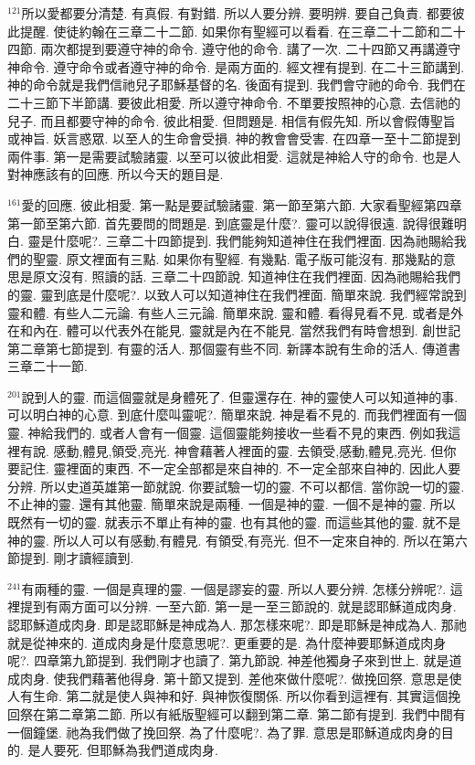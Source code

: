 \documentclass{book}
\begin{document}
$^{121}$所以愛都要分清楚.
有真假.
有對錯.
所以人要分辨.
要明辨.
要自己負責.
都要彼此提醒.
使徒約翰在三章二十二節.
如果你有聖經可以看看.
在三章二十二節和二十四節.
兩次都提到要遵守神的命令.
遵守他的命令.
講了一次.
二十四節又再講遵守神命令.
遵守命令或者遵守神的命令.
是兩方面的.
經文裡有提到.
在二十三節講到.
神的命令就是我們信祂兒子耶穌基督的名.
後面有提到.
我們會守祂的命令.
我們在二十三節下半節講.
要彼此相愛.
所以遵守神命令.
不單要按照神的心意.
去信祂的兒子.
而且都要守神的命令.
彼此相愛.
但問題是.
相信有假先知.
所以會假傳聖旨或神旨.
妖言惑眾.
以至人的生命會受損.
神的教會會受害.
在四章一至十二節提到兩件事.
第一是需要試驗諸靈.
以至可以彼此相愛.
這就是神給人守的命令.
也是人對神應該有的回應.
所以今天的題目是.

$^{161}$愛的回應.
彼此相愛.
第一點是要試驗諸靈.
第一節至第六節.
大家看聖經第四章第一節至第六節.
首先要問的問題是.
到底靈是什麼?.
靈可以說得很遠.
說得很難明白.
靈是什麼呢?.
三章二十四節提到.
我們能夠知道神住在我們裡面.
因為祂賜給我們的聖靈.
原文裡面有三點.
如果你有聖經.
有幾點.
電子版可能沒有.
那幾點的意思是原文沒有.
照讀的話.
三章二十四節說.
知道神住在我們裡面.
因為祂賜給我們的靈.
靈到底是什麼呢?.
以致人可以知道神住在我們裡面.
簡單來說.
我們經常說到靈和體.
有些人二元論.
有些人三元論.
簡單來說.
靈和體.
看得見看不見.
或者是外在和內在.
體可以代表外在能見.
靈就是內在不能見.
當然我們有時會想到.
創世記第二章第七節提到.
有靈的活人.
那個靈有些不同.
新譯本說有生命的活人.
傳道書三章二十一節.

$^{201}$說到人的靈.
而這個靈就是身體死了.
但靈還存在.
神的靈使人可以知道神的事.
可以明白神的心意.
到底什麼叫靈呢?.
簡單來說.
神是看不見的.
而我們裡面有一個靈.
神給我們的.
或者人會有一個靈.
這個靈能夠接收一些看不見的東西.
例如我這裡有說.
感動,體見,領受,亮光.
神會藉著人裡面的靈.
去領受,感動,體見,亮光.
但你要記住.
靈裡面的東西.
不一定全部都是來自神的.
不一定全部來自神的.
因此人要分辨.
所以史道英雄第一節就說.
你要試驗一切的靈.
不可以都信.
當你說一切的靈.
不止神的靈.
還有其他靈.
簡單來說是兩種.
一個是神的靈.
一個不是神的靈.
所以既然有一切的靈.
就表示不單止有神的靈.
也有其他的靈.
而這些其他的靈.
就不是神的靈.
所以人可以有感動,有體見.
有領受,有亮光.
但不一定來自神的.
所以在第六節提到.
剛才讀經讀到.

$^{241}$有兩種的靈.
一個是真理的靈.
一個是謬妄的靈.
所以人要分辨.
怎樣分辨呢?.
這裡提到有兩方面可以分辨.
一至六節.
第一是一至三節說的.
就是認耶穌道成肉身.
認耶穌道成肉身.
即是認耶穌是神成為人.
那怎樣來呢?.
即是耶穌是神成為人.
那祂就是從神來的.
道成肉身是什麼意思呢?.
更重要的是.
為什麼神要耶穌道成肉身呢?.
四章第九節提到.
我們剛才也讀了.
第九節說.
神差他獨身子來到世上.
就是道成肉身.
使我們藉著他得身.
第十節又提到.
差他來做什麼呢?.
做挽回祭.
意思是使人有生命.
第二就是使人與神和好.
與神恢復關係.
所以你看到這裡有.
其實這個挽回祭在第二章第二節.
所以有紙版聖經可以翻到第二章.
第二節有提到.
我們中間有一個鐘堡.
祂為我們做了挽回祭.
為了什麼呢?.
為了罪.
意思是耶穌道成肉身的目的.
是人要死.
但耶穌為我們道成肉身.
\end{document}

